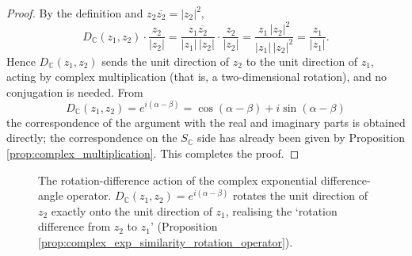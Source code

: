 \begin{proof}
By the definition and $z_2\overline{z_2}=|z_2|^2$,
\[
D_{\mathbb C}(z_1,z_2)\cdot\frac{z_2}{|z_2|}
=
\frac{z_1\overline{z_2}}{|z_1|\,|z_2|}\cdot\frac{z_2}{|z_2|}
=
\frac{z_1\,|z_2|^2}{|z_1|\,|z_2|^2}
=
\frac{z_1}{|z_1|}.
\]
Hence $D_{\mathbb C}(z_1,z_2)$ sends the unit direction of $z_2$ to the unit direction of $z_1$, acting by complex multiplication (that is, a two-dimensional rotation), and no conjugation is needed. From
\[
D_{\mathbb C}(z_1,z_2)=e^{i(\alpha-\beta)}=\cos(\alpha-\beta)+i\sin(\alpha-\beta)
\]
the correspondence of the argument with the real and imaginary parts is obtained directly; the correspondence on the $S_{\mathbb C}$ side has already been given by Proposition \ref{prop:complex_multiplication}. This completes the proof.
\end{proof}

\begin{figure}[htbp]
    \centering
    \caption{The rotation-difference action of the complex exponential difference-angle operator. $D_{\mathbb{C}}(z_1,z_2)=e^{i(\alpha-\beta)}$ rotates the unit direction of $z_2$ exactly onto the unit direction of $z_1$, realising the `rotation difference from $z_2$ to $z_1$' (Proposition \ref{prop:complex_exp_similarity_rotation_operator}).}
    \label{fig:complex_exp_rotation_operator}
\end{figure}

